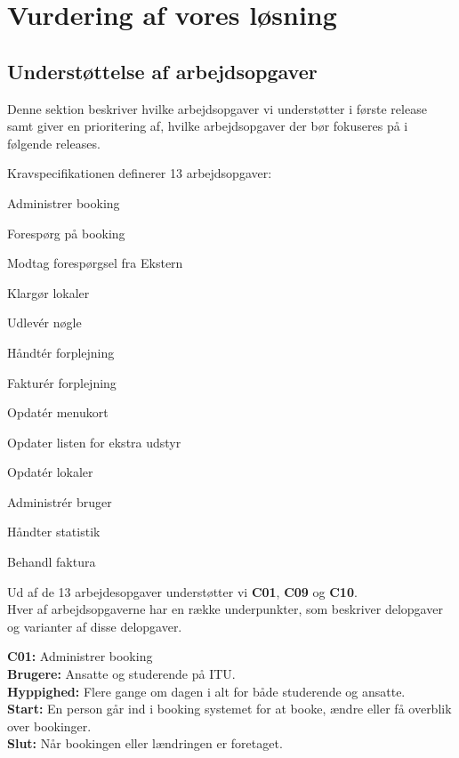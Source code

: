 \chapter{Vurdering af vores løsning}
\label{Evaluation}

\section{Understøttelse af arbejdsopgaver}
\label{Evaluation_workareas}
Denne sektion beskriver hvilke arbejdsopgaver vi understøtter i første release samt giver en prioritering af, hvilke arbejdsopgaver der bør fokuseres på i følgende releases.

Kravspecifikationen definerer 13 arbejdsopgaver:
\begin{my_enumerate}
\item[\textbf{C01.}]{Administrer booking}
\item[\textbf{C02.}]{Forespørg på booking}
\item[\textbf{C03.}]{Modtag forespørgsel fra Ekstern}
\item[\textbf{C04.}]{Klargør lokaler}
\item[\textbf{C05.}]{Udlevér nøgle}
\item[\textbf{C06.}]{Håndtér forplejning}
\item[\textbf{C07.}]{Fakturér forplejning}
\item[\textbf{C08.}]{Opdatér menukort}
\item[\textbf{C09.}]{Opdater listen for ekstra udstyr}
\item[\textbf{C10.}]{Opdatér lokaler}
\item[\textbf{C11.}]{Administrér bruger}
\item[\textbf{C12.}]{Håndter statistik}
\item[\textbf{C13.}]{Behandl faktura}
\end{my_enumerate}

Ud af de 13 arbejdesopgaver understøtter vi \textbf{C01}, \textbf{C09} og \textbf{C10}.
\\Hver af arbejdsopgaverne har en række underpunkter, som beskriver delopgaver og varianter af disse delopgaver.

\textbf{C01:} Administrer booking\\
\textbf{Brugere:} Ansatte og studerende på ITU.\\
\textbf{Hyppighed:} Flere gange om dagen i alt for både studerende og ansatte.\\
\textbf{Start:} En person går ind i booking systemet for at booke, ændre eller få overblik over bookinger.\\
\textbf{Slut:} Når bookingen eller lændringen er foretaget.

